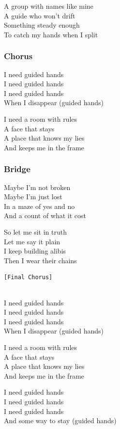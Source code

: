 A group with names like mine\\
A guide who won't drift\\
Something steady enough\\
To catch my hands when I split

\subsubsection{Chorus}\label{chorus-16}

I need guided hands\\
I need guided hands\\
I need guided hands\\
When I disappear (guided hands)

I need a room with rules\\
A face that stays\\
A place that knows my lies\\
And keeps me in the frame

\subsubsection{Bridge}\label{bridge-4}

Maybe I'm not broken\\
Maybe I'm just lost\\
In a maze of yes and no\\
And a count of what it cost

So let me sit in truth\\
Let me say it plain\\
I keep building alibis\\
Then I wear their chains

\texttt{{[}Final\ Chorus{]}}\strut \\
I need guided hands\\
I need guided hands\\
I need guided hands\\
When I disappear (guided hands)

I need a room with rules\\
A face that stays\\
A place that knows my lies\\
And keeps me in the frame

I need guided hands\\
I need guided hands\\
I need guided hands\\
And some way to stay (guided hands)

